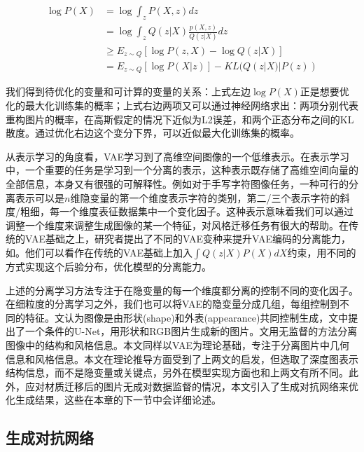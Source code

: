 \documentclass[UTF8,openany,AutoFakeBold,AutoFakeSlant,cs4size]{ctexbook}
\begin{document}
\begin{equation}
	\begin{aligned}
		\log P(X) &= \log \int_{z} P(X, z) dz \\
		&= \log \int_{z} Q(z | X)\frac{p(X, z)}{Q(z | X)} dz \\
		&\geq  E_{z \sim Q}[\log P(z, X) - \log Q(z|X)] \\
		&= E_{z \sim Q}[\log P(X|z)] - KL(Q(z|X) | P(z))
	\end{aligned}
\end{equation}

我们得到待优化的变量和可计算的变量的关系：上式左边$\log P(X)$正是想要优化的最大化训练集的概率；上式右边两项又可以通过神经网络求出：两项分别代表重构图片的概率，在高斯假定的情况下近似为L2误差，和两个正态分布之间的KL散度。通过优化右边这个变分下界，可以近似最大化训练集的概率。

从表示学习的角度看，VAE学习到了高维空间图像的一个低维表示。在表示学习中，一个重要的任务是学习到一个分离的表示，这种表示既存储了高维空间向量的全部信息，本身又有很强的可解释性。例如对于手写字符图像任务，一种可行的分离表示可以是$n$维隐变量的第一个维度表示字符的类别，第二/三个表示字符的斜度/粗细，每一个维度表征数据集中一个变化因子。这种表示意味着我们可以通过调整一个维度来调整生成图像的某一个特征，对风格迁移任务有很大的帮助。在传统的VAE基础之上，研究者提出了不同的VAE变种来提升VAE编码的分离能力，如\cite{Burgess2018UnderstandingDI, RubSchTol18b}。他们可以看作在传统的VAE基础上加入$\int Q(z|X) P(X) dX$约束，用不同的方式实现这个后验分布，优化模型的分离能力。

上述的分离学习方法专注于在隐变量的每一个维度都分离的控制不同的变化因子。在细粒度的分离学习之外，我们也可以将VAE的隐变量分成几组，每组控制到不同的特征。\cite{vunet2018}文认为图像是由形状(shape)和外表(appearance)共同控制生成，文中提出了一个条件的U-Net，用形状和RGB图片生成新的图片。\cite{Wu2019DisentanglingCA}文用无监督的方法分离图像中的结构和风格信息。本文同样以VAE为理论基础，专注于分离图片中几何信息和风格信息。本文在理论推导方面受到了上两文的启发，但选取了深度图表示结构信息，而不是隐变量\cite{vunet2018}或关键点\cite{Wu2019DisentanglingCA}，另外在模型实现方面也和上两文有所不同。此外，应对材质迁移后的图片无成对数据监督的情况，本文引入了生成对抗网络来优化生成结果，这些在本章的下一节中会详细论述。

\subsection{生成对抗网络}
\end{document}
